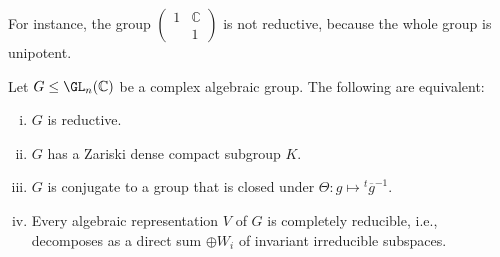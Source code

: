 \documentclass[reqno]{amsart} 
\begin{document}
For instance, the group $
\begin{pmatrix}
  1 & \mathbb{C}  \\
  & 1
\end{pmatrix}
$ is not reductive, because the whole group is unipotent.

\begin{theorem}\label{thm:reductive-groups}
  Let $G \leq \GL_n(\mathbb{C})$ be a complex algebraic group.  The following are equivalent:
  \begin{enumerate}
[(i)]
  \item $G$ is reductive.
  \item $G$ has a Zariski dense compact subgroup $K$.
  \item $G$ is conjugate to a group that is closed under $\Theta : g \mapsto {}^t \overline{g} ^{-1}$.
  \item Every algebraic representation $V$ of $G$ is completely reducible, i.e., decomposes as a direct sum $\oplus W_i$ of invariant irreducible subspaces.
  \end{enumerate}
\end{theorem}
\end{document}
